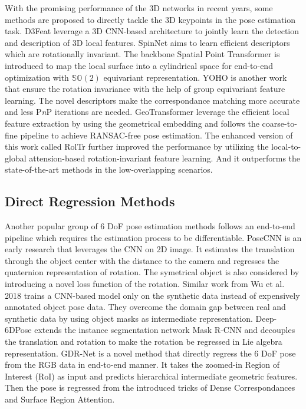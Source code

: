 \documentclass[12pt,DIV14,BCOR12mm,a4paper,footinclude=false,headinclude,parskip=half-,twoside,openright,cleardoublepage=empty,toc=index,bibliography=totoc,listof=totoc]{scrreprt}
\numberwithin{equation}{chapter}
\begin{document}
With the promising performance of the 3D networks \cite{qi2017pointnet,qi2017pointnet++} in recent years, some methods are proposed to directly tackle the 3D keypoints in the pose estimation task. D3Feat \cite{bai2020d3feat} leverage a 3D CNN-based architecture to jointly learn the detection and description of 3D local features. SpinNet \cite{ao2021spinnet} aims to learn efficient descriptors which are rotationally invariant. The backbone Spatial Point Transformer is introduced to map the local surface into a cylindrical space for end-to-end optimization with $\mathbb{SO}(2)$ equivariant representation. YOHO \cite{wang2022hypothesize} is another work that ensure the rotation invariance with the help of group equivariant feature learning. The novel descriptors make the correspondance matching more accurate and less P\textit{n}P iterations are needed. GeoTransformer \cite{qin2022geometric} leverage the efficient local feature extraction by using the geometrical embedding and follows the coarse-to-fine pipeline to achieve RANSAC-free pose estimation. The enhanced version of this work called RolTr \cite{yu2023rotationinvariant} further improved the performance by utilizing the local-to-global attension-based rotation-invariant feature learning. And it outperforms the state-of-the-art methods in the low-overlapping scenarios.


\subsection{Direct Regression Methods}
Another popular group of 6 DoF pose estimation methods follows an end-to-end pipeline which requires the estimation process to be differentiable.
PoseCNN\cite{xiang2018posecnn} is an early research that leverages the CNN on 2D image. It estimates the translation through the object center with the distance to the camera and regresses the quaternion representation of rotation. The symetrical object is also considered by introducing a novel loss function of the rotation. Similar work from Wu et al. 2018 \cite{Wu_2018} trains a CNN-based model only on the synthetic data instead of expensively annotated object pose data. They overcome the domain gap between real and synthetic data by using object masks as intermediate representation. Deep-6DPose \cite{do2018deep6dpose} extends the instance segmentation network Mask R-CNN \cite{he2018mask} and decouples the translation and rotation to make the rotation be regressed in Lie algebra representation. GDR-Net \cite{wang2021gdrnet} is a novel method that directly regress the 6 DoF pose from the RGB data in end-to-end manner. It takes the zoomed-in Region of Interest (RoI) as input and predicts hierarchical intermediate geometric features. Then the pose is regressed from the introduced tricks of Dense Correspondances and Surface Region Attention.
\end{document}
